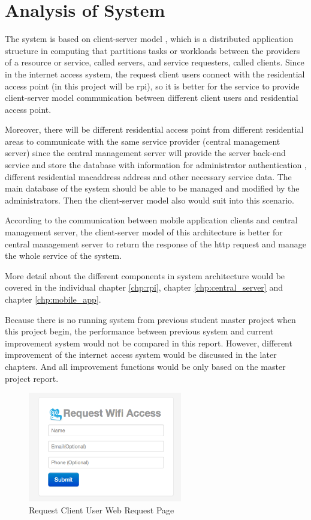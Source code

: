 \section{Analysis of System}
\par The system is based on client-server model \cite{csmodel}, which is a distributed application structure in computing that partitions tasks or workloads between the providers of a resource or service, called servers, and service requesters, called clients. Since in the internet access system, the request client users connect with the residential access point (in this project will be \gls{rpi}), so it is better for the service to provide client-server model communication between different client users and residential access point. 
\par Moreover, there will be different residential access point from different residential areas to communicate with the same service provider (central management server) since the central management server will provide the server back-end service and store the database with information for administrator authentication , different residential \gls{macaddress} address and other necessary service data. The main database of the system should be able to be managed and modified by the administrators. Then the client-server model also would suit into this scenario.
\par According to the communication between mobile application clients and central management server, the client-server model of this architecture is better for central management server to return the response of the \gls{http} request and manage the whole service of the system.
\par More detail about the different components in system architecture would be covered in the individual chapter \ref{chp:rpi}, chapter \ref{chp:central_server} and chapter \ref{chp:mobile_app}.
\par Because there is no running system from previous student master project when this project begin, the performance between previous system and current improvement system would not be compared in this report. However, different improvement of the internet access system would be discussed in the later chapters. And all improvement functions would be only based on the master project report\cite{TorgeirMR}.

\begin{figure}
	\centering
    	\includegraphics[width=0.60\textwidth,natwidth=610,natheight=642]{figs/wifi_request_page.png}
  	\caption{Request Client User Web Request Page}
  	\label{fig:wifi_request_page}
\end{figure}

